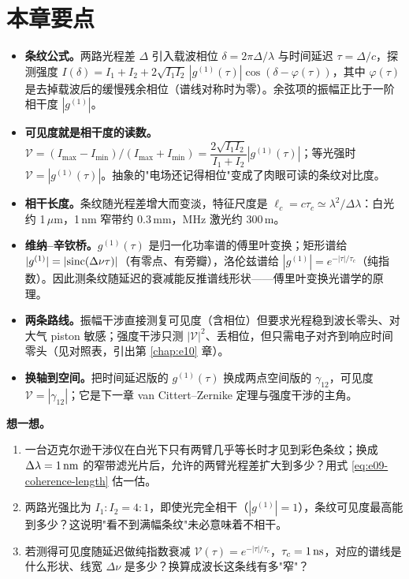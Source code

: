 \section{本章要点}
\label{sec:e09-summary}

\begin{itemize}
  \item \textbf{条纹公式。}两路光程差 \(\Delta\) 引入载波相位 \(\delta=2\pi\Delta/\lambda\) 与时间延迟 \(\tau=\Delta/c\)，探测强度 \(I(\delta)=I_1+I_2+2\sqrt{I_1I_2}\,|g^{(1)}(\tau)|\cos(\delta-\varphi(\tau))\)，其中 \(\varphi(\tau)\) 是去掉载波后的缓慢残余相位（谱线对称时为零）。余弦项的振幅正比于一阶相干度 \(|g^{(1)}|\)。
  \item \textbf{可见度就是相干度的读数。}\(\mathcal V=(I_{\max}-I_{\min})/(I_{\max}+I_{\min})=\dfrac{2\sqrt{I_1I_2}}{I_1+I_2}|g^{(1)}(\tau)|\)；等光强时 \(\mathcal V=|g^{(1)}(\tau)|\)。抽象的"电场还记得相位"变成了肉眼可读的条纹对比度。
  \item \textbf{相干长度。}条纹随光程差增大而变淡，特征尺度是 \(\ell_c=c\tau_c\simeq\lambda^2/\Delta\lambda\)：白光约 1\,\(\mu\)m，1\,nm 窄带约 0.3\,mm，MHz 激光约 300\,m。
  \item \textbf{维纳--辛钦桥。}\(g^{(1)}(\tau)\) 是归一化功率谱的傅里叶变换；矩形谱给 \(|g^{(1)}|=|{\rm sinc}(\Delta\nu\tau)|\)（有零点、有旁瓣），洛伦兹谱给 \(|g^{(1)}|=e^{-|\tau|/\tau_c}\)（纯指数）。因此测条纹随延迟的衰减能反推谱线形状——傅里叶变换光谱学的原理。
  \item \textbf{两条路线。}振幅干涉直接测复可见度（含相位）但要求光程稳到波长零头、对大气 piston 敏感；强度干涉只测 \(|\mathcal V|^2\)、丢相位，但只需电子对齐到响应时间零头（见对照表，引出第 \ref{chap:e10} 章）。
  \item \textbf{换轴到空间。}把时间延迟版的 \(g^{(1)}(\tau)\) 换成两点空间版的 \(\gamma_{12}\)，可见度 \(\mathcal V=|\gamma_{12}|\)；它是下一章 van Cittert--Zernike 定理与强度干涉的主角。
\end{itemize}

\medskip
\noindent\textbf{想一想。}
\begin{enumerate}
  \item 一台迈克尔逊干涉仪在白光下只有两臂几乎等长时才见到彩色条纹；换成 \(\Delta\lambda=1\,{\rm nm}\) 的窄带滤光片后，允许的两臂光程差扩大到多少？用式 \eqref{eq:e09-coherence-length} 估一估。
  \item 两路光强比为 \(I_1:I_2=4:1\)，即使光完全相干（\(|g^{(1)}|=1\)），条纹可见度最高能到多少？这说明"看不到满幅条纹"未必意味着不相干。
  \item 若测得可见度随延迟做纯指数衰减 \(\mathcal V(\tau)=e^{-|\tau|/\tau_c}\)，\(\tau_c=1\,{\rm ns}\)，对应的谱线是什么形状、线宽 \(\Delta\nu\) 是多少？换算成波长这条线有多"窄"？
\end{enumerate}
